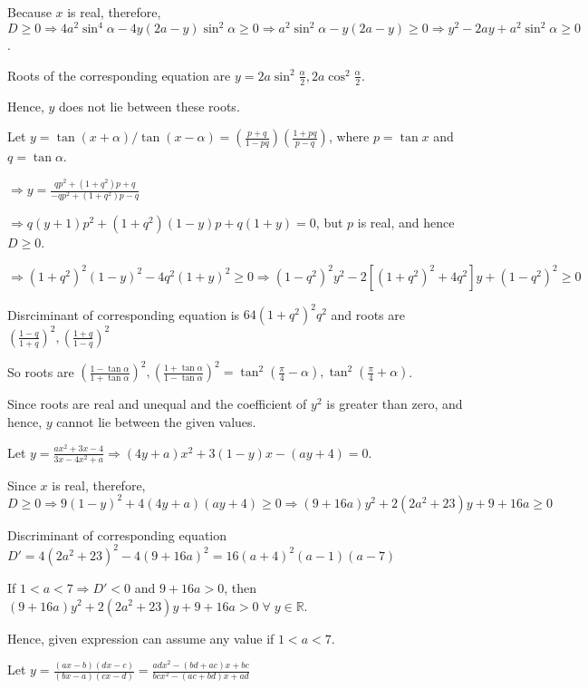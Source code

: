   Because $x$ is real, therefore, $D\geq 0 \Rightarrow 4a^2\sin^4\alpha - 4y(2a - y)\sin^2\alpha\geq 0
  \Rightarrow a^2\sin^2\alpha - y(2a - y)\geq 0 \Rightarrow y^2 - 2ay + a^2\sin^2\alpha\geq 0$.

  Roots of the corresponding equation are $y = 2a\sin^2\frac{\alpha}{2}, 2a\cos^2\frac{\alpha}{2}$.

  Hence, $y$ does not lie between these roots.
\item Let $y = \tan(x + \alpha)/\tan(x - \alpha) = \left(\frac{p + q}{1 - pq}\right)\left(\frac{1 + pq}{p -
  q}\right)$, where $p = \tan x$ and $q = \tan\alpha$.

  $\Rightarrow y = \frac{qp^2 + (1 + q^2)p + q}{-qp^2 + (1 + q^2)p - q}$

  $\Rightarrow q(y + 1)p^2 + (1 + q^2)(1 - y)p + q(1 + y) = 0$, but $p$ is real, and hence $D\geq 0$.

  $\Rightarrow (1 + q^2)^2(1 - y)^2 - 4q^2(1 + y)^2\geq 0 \Rightarrow (1 - q^2)^2y^2 - 2[(1 + q^2)^2 +
  4q^2]y + (1 - q^2)^2\geq 0$

  Disrciminant of corresponding equation is $64(1 + q^2)^2q^2$ and roots are $\left(\frac{1 - q}{1 +
    q}\right)^2, \left(\frac{1 + q}{1 - q}\right)^2$

  So roots are $\left(\frac{1 - \tan\alpha}{1 + \tan\alpha}\right)^2, \left(\frac{1 + \tan\alpha}{1 -
    \tan\alpha}\right)^2 = \tan^2\left(\frac{\pi}{4} - \alpha\right), \tan^2\left(\frac{\pi}{4} +
  \alpha\right)$.

  Since roots are real and unequal and the coefficient of $y^2$ is greater than zero, and hence, $y$ cannot
  lie between the given values.
\item Let $y = \frac{ax^2 + 3x - 4}{3x - 4x^2 + a} \Rightarrow (4y + a)x^2 + 3(1 - y)x - (ay + 4) = 0$.

  Since $x$ is real, therefore, $D\geq 0 \Rightarrow 9(1 - y)^2 + 4(4y + a)(ay + 4)\geq 0 \Rightarrow (9 +
  16a)y^2 + 2(2a^2 + 23)y + 9 + 16a\geq 0$

  Discriminant of corresponding equation $D' = 4(2a^2 + 23)^2 - 4(9 + 16a)^2 = 16(a + 4)^2(a - 1)(a - 7)$

  If $1 < a < 7 \Rightarrow D' < 0$ and $9 + 16a > 0$, then $(9 + 16a)y^2 + 2(2a^2 + 23)y + 9 + 16a >
  0\;\forall\;y\in\mathbb{R}$.

  Hence, given expression can assume any value if $1 < a < 7$.
\item Let $y = \frac{(ax - b)(dx - c)}{(bx - a)(cx - d)} = \frac{adx^2 - (bd + ac)x + bc}{bcx^2 - (ac + bd)x
  + ad}$


